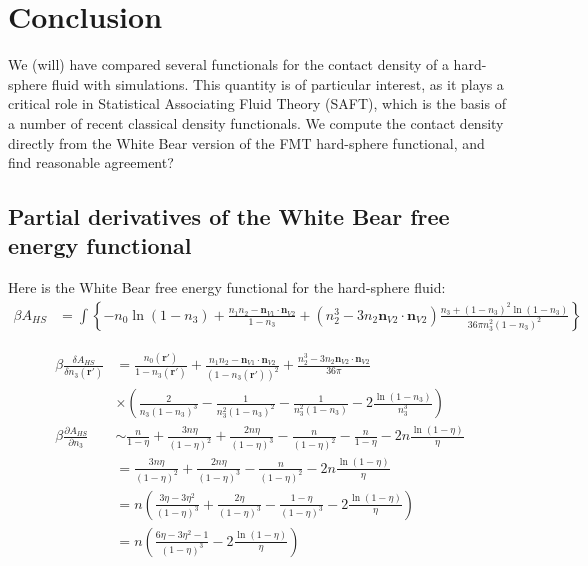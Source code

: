 \documentclass[letterpaper,twocolumn,amsmath,amssymb,prb]{revtex4-1}
\begin{document}
\section{Conclusion}
We (will) have compared several functionals for the contact density of
a hard-sphere fluid with simulations.  This quantity is of particular
interest, as it plays a critical role in Statistical Associating Fluid
Theory (SAFT), which is the basis of a number of recent classical
density functionals.  We compute the contact density directly from the
White Bear version of the FMT hard-sphere functional, and find
reasonable agreement?

\begin{widetext}
  \appendix

  \section{Partial derivatives of the White Bear free energy functional}

  Here is the White Bear free energy functional for the hard-sphere
  fluid:~\cite{roth2002whitebear}
  \begin{align}
    \beta A_{HS} &= \int \left\{
    -n_0 \ln\left( 1 - n_3\right)
    + \frac{n_1 n_2 - \mathbf{n}_{V1} \cdot\mathbf{n}_{V2}}{1-n_3}
    + (n_2^3 - 3 n_2 \mathbf{n}_{V2} \cdot \mathbf{n}_{V2}) \frac{
      n_3 + (1-n_3)^2 \ln(1-n_3)
    }{
      36\pi n_3^2(1-n_3)^2
    }
    \right\}
\end{align}

\begin{align}
    \beta\frac{\delta A_{HS}}{\delta n_3(\mathbf{r}')} &=
    \frac{n_0(\mathbf{r}')}{1 - n_3(\mathbf{r}')}
    + \frac{n_1n_2 - \mathbf{n}_{V1}\cdot\mathbf{n}_{V2}}{(1 -
      n_3(\mathbf{r}'))^2}
    + \frac{n_2^3 -
      3n_2\mathbf{n}_{V2}\cdot\mathbf{n}_{V2}}{36\pi}
    \\
    & \times \left(\frac{2}{n_3(1-n_3)^3} -\frac1{n_3^2(1-n_3)^2}  -
      \frac{1}{n_3^2(1-n_3)} - 2\frac{\ln(1-n_3)}{n_3^3}\right) \\
    \beta\frac{\partial A_{HS}}{\partial n_3}
    &\sim \frac{n}{1-\eta} + \frac{3n\eta}{(1-\eta)^2} +
      \frac{2n\eta}{(1-\eta)^3} -
      \frac{n}{(1-\eta)^2} -
      \frac{n}{1-\eta} -
      2n \frac{ \ln(1-\eta) }{ \eta } \\
    &= \frac{3n\eta}{(1-\eta)^2} +
      \frac{2n\eta}{(1-\eta)^3} -
      \frac{n}{(1-\eta)^2} -
      2n \frac{ \ln(1-\eta) }{ \eta } \\
    &= n\left(
      \frac{3\eta - 3 \eta^2}{(1-\eta)^3} +
      \frac{2\eta}{(1-\eta)^3} -
      \frac{1 - \eta}{(1-\eta)^3} -
      2 \frac{ \ln(1-\eta) }{ \eta }
      \right) \\
    &= n\left(
      \frac{6\eta - 3 \eta^2 - 1}{(1-\eta)^3} -
      2 \frac{ \ln(1-\eta) }{ \eta }
      \right)
\end{align}
\end{widetext}
\end{document}
